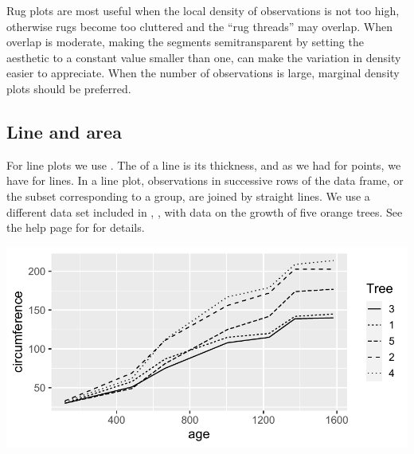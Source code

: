 \documentclass[krantz2]{krantz}\usepackage{knitr}
\begin{document}
\begin{warningbox}
  Rug plots are most useful when the local density of observations is not too high, otherwise rugs become too cluttered and the ``rug threads'' may overlap. When overlap is moderate, making the segments semitransparent by setting the  aesthetic to a constant value smaller than one, can make the variation in density easier to appreciate. When the number of observations is large, marginal density plots should be preferred.
\end{warningbox}

\subsection{Line and area}\label{sec:plot:line}

For line plots we use . The  of a line is its thickness, and as we had  for points, we have  for lines. In a line plot, observations in successive rows of the data frame, or the subset corresponding to a group, are joined by straight lines. We use a different data set included in \Rlang, , with data on the growth of five orange trees. See the help page for  for details.

\label{plot:fig:lines}
\begin{knitrout}\footnotesize
{}\color{fgcolor}\begin{kframe}
\begin{alltt}
\hlstd{(} 
       \hlstd{(}      \hlopt{+}
  \hlstd{()}
\end{alltt}
\end{kframe}

{\centering \includegraphics[width=.7\textwidth]{figure/pos-line-plot-01-1} 

}



\end{knitrout}
\end{document}
